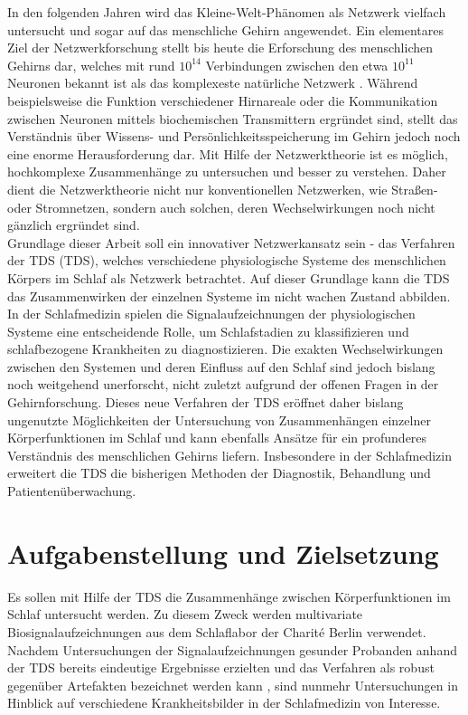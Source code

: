 In den folgenden Jahren wird das Kleine-Welt-Phänomen als Netzwerk vielfach untersucht und sogar auf das menschliche Gehirn angewendet. Ein elementares Ziel der Netzwerkforschung stellt bis heute die Erforschung des menschlichen Gehirns dar, welches mit rund $10^{14}$ Verbindungen zwischen den etwa $10^{11}$ Neuronen bekannt ist als das komplexeste natürliche Netzwerk \parencite{ertel_grundkurs_2013}. Während beispielsweise die Funktion verschiedener Hirnareale oder die Kommunikation zwischen Neuronen mittels biochemischen Transmittern ergründet sind, stellt das Verständnis über Wissens- und Persönlichkeitsspeicherung im Gehirn jedoch noch eine enorme Herausforderung dar. Mit Hilfe der Netzwerktheorie ist es möglich, hochkomplexe Zusammenhänge zu untersuchen und besser zu verstehen. Daher dient die Netzwerktheorie nicht nur konventionellen Netzwerken, wie Straßen- oder Stromnetzen, sondern auch solchen, deren Wechselwirkungen noch nicht gänzlich ergründet sind. \parencite{lenzen_alles_2016}\\

Grundlage dieser Arbeit soll ein innovativer Netzwerkansatz sein - das Verfahren der \acl{TDS} (\acs{TDS}), welches verschiedene physiologische Systeme des menschlichen Körpers im Schlaf als Netzwerk betrachtet. Auf dieser Grundlage kann die \acs{TDS} das Zusammenwirken der einzelnen Systeme im nicht wachen Zustand abbilden. In der Schlafmedizin spielen die Signalaufzeichnungen der physiologischen Systeme eine entscheidende Rolle, um Schlafstadien zu klassifizieren und schlafbezogene Krankheiten zu diagnostizieren. Die exakten Wechselwirkungen zwischen den Systemen und deren Einfluss auf den Schlaf sind jedoch bislang noch weitgehend unerforscht, nicht zuletzt aufgrund der offenen Fragen in der Gehirnforschung. Dieses neue Verfahren der \acs{TDS} eröffnet daher bislang ungenutzte Möglichkeiten der Untersuchung von Zusammenhängen einzelner Körperfunktionen im Schlaf und kann ebenfalls Ansätze für ein profunderes Verständnis des menschlichen Gehirns liefern. Insbesondere in der Schlafmedizin erweitert die \acs{TDS} die bisherigen Methoden der Diagnostik, Behandlung und Patientenüberwachung. \parencite{bashan_network_2012, penzel_schlafstorungen_2005}

\section{Aufgabenstellung und Zielsetzung}

Es sollen mit Hilfe der \acs{TDS} die Zusammenhänge zwischen Körperfunktionen im Schlaf untersucht werden. Zu diesem Zweck werden multivariate Biosignalaufzeichnungen aus dem Schlaflabor der Charité Berlin verwendet. Nachdem Untersuchungen der Signalaufzeichnungen gesunder Probanden anhand der \acs{TDS} bereits eindeutige Ergebnisse erzielten \parencite{bashan_network_2012} und das Verfahren als robust gegenüber Artefakten bezeichnet werden kann \parencite{breuer_netzwerktopologie_2016}, sind nunmehr Untersuchungen in Hinblick auf verschiedene Krankheitsbilder in der Schlafmedizin von Interesse. 

